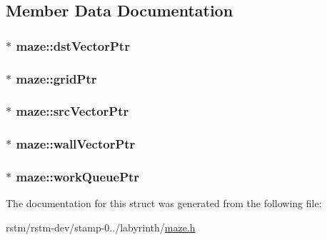 \subsection{Member Data Documentation}
\hypertarget{structmaze_a1478040a9fe78b72493531a7279a0642}{
\subsubsection[{dst\-Vector\-Ptr}]{$\ast$ maze\-::dst\-Vector\-Ptr}}\label{structmaze_a1478040a9fe78b72493531a7279a0642}
\hypertarget{structmaze_a1c3618abe388f94f6990cf11539780c1}{
\subsubsection[{grid\-Ptr}]{$\ast$ maze\-::grid\-Ptr}}\label{structmaze_a1c3618abe388f94f6990cf11539780c1}
\hypertarget{structmaze_a9a60c3cb30fdf50ec40ddabafabaf747}{
\subsubsection[{src\-Vector\-Ptr}]{$\ast$ maze\-::src\-Vector\-Ptr}}\label{structmaze_a9a60c3cb30fdf50ec40ddabafabaf747}
\hypertarget{structmaze_aac2b0e755ef7adab115a9812fb8f6b8d}{
\subsubsection[{wall\-Vector\-Ptr}]{$\ast$ maze\-::wall\-Vector\-Ptr}}\label{structmaze_aac2b0e755ef7adab115a9812fb8f6b8d}
\hypertarget{structmaze_ab7b6ffa234ffc91a338efe69088a6c12}{
\subsubsection[{work\-Queue\-Ptr}]{$\ast$ maze\-::work\-Queue\-Ptr}}\label{structmaze_ab7b6ffa234ffc91a338efe69088a6c12}


The documentation for this struct was generated from the following file\-:\begin{DoxyCompactItemize}
\item 
rstm/rstm-\/dev/stamp-\/0../labyrinth/\hyperlink{maze_8h}{maze.\-h}\end{DoxyCompactItemize}
